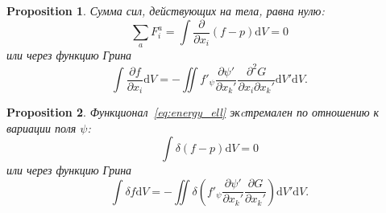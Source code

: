 \documentclass{article}
\theoremstyle{plain}
\newtheorem{proposition}{Proposition}
\newcommand{\dd}{\mathrm{d}}
\newcommand{\pder}[2][]{\frac{\partial#1}{\partial#2}}
\newcommand{\pderder}[3][]{\frac{\partial^2#1}{\partial#2\partial#3}}
\begin{document}
\begin{proposition}
    Сумма сил, действующих на тела, равна нулю:
    \begin{equation}\label{eq:problem1}
        \sum_a F^a_i = \int \pder{x_i}(f-p) \dd{V} = 0
    \end{equation}
    или через функцию Грина
    \begin{equation}\label{eq:problem1_Green}
        \int \pder[f]{x_i} \dd{V} = -\iint f'_\psi\pder[\psi']{x_k'} \pderder[G]{x_i}{x_k'} \dd{V'}\dd{V}.
    \end{equation}
\end{proposition}

\begin{proposition}
    Функционал~\eqref{eq:energy_ell} экcтремален по отношению к вариации поля \(\psi\):
    \begin{equation}\label{eq:problem2}
        \int \delta(f-p)\dd{V} = 0
    \end{equation}
    или через функцию Грина
    \begin{equation}\label{eq:problem2_Green}
        \int\delta{f}\dd{V} = -\iint \delta\left( f'_\psi\pder[\psi']{x_k'}\pder[G]{x_k'}\right) \dd{V'}\dd{V}.
    \end{equation}
\end{proposition}


\printbibliography
\end{document}
